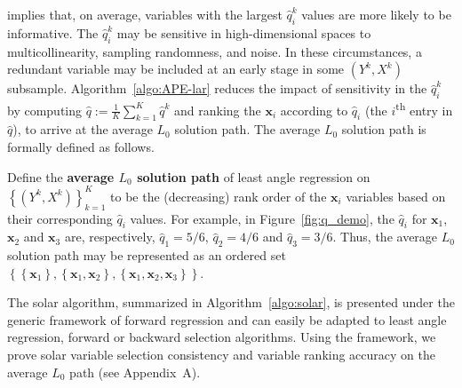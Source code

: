 \documentclass[11pt,review,authoryear]{elsarticle}
\begin{document}
\citet[Theorem 2]{zhang09} implies that, on average, variables with the largest $\widehat{q}^k_i$ values are more likely to be informative. The $\widehat{q}^k_i$ may be sensitive in high-dimensional spaces to multicollinearity, sampling randomness, and noise. In these circumstances, a redundant variable may be included at an early stage in some $\left( Y^k, X^k \right)$ subsample. Algorithm~\ref{algo:APE-lar} reduces the impact of sensitivity in the $\widehat{q}^k_i$ by computing $\widehat{q} := \frac{1}{K} \sum_{k=1}^{K} \widehat{q}^k$ and ranking the $\mathbf{x}_i$ according to $\widehat{q}_i$ (the $i$\textsuperscript{th} entry in $\widehat{q}$), to arrive at the average $L_0$ solution path. The average $L_0$ solution path is formally defined as follows.


\begin{definition}
  Define the \textbf{average $L_0$ solution path} of least angle regression on $\left\{ \left( Y^k, X^k \right) \right\}_{k=1}^{K}$ to be the (decreasing) rank order of the $\mathbf{x}_i$ variables based on their corresponding $\widehat{q}_i$ values. For example, in Figure~\ref{fig:q_demo}, the $\widehat{q}_i$ for $\mathbf{x}_1$, $\mathbf{x}_2$ and $\mathbf{x}_3$ are, respectively, $\widehat{q}_1 = 5/6$, $\widehat{q}_2 = 4/6$ and $\widehat{q}_3 = 3/6$. Thus, the average $L_0$ solution path may be represented as an ordered set $\left\{ \left\{ \mathbf{x}_1 \right\}, \left\{ \mathbf{x}_1, \mathbf{x}_2 \right\}, \left\{ \mathbf{x}_1, \mathbf{x}_2, \mathbf{x}_3 \right\} \right\}$.
  \label{def:L_0_solution_path}
\end{definition}


The solar algorithm, summarized in Algorithm~\ref{algo:solar}, is presented under the generic framework of forward regression and can easily be adapted to least angle regression, forward or backward selection algorithms. Using the \citet{zhang09} framework, we prove solar variable selection consistency and variable ranking accuracy on the average $L_0$ path (see Appendix~A).

\end{document}

